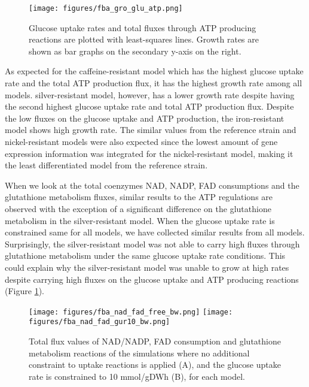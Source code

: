 \begin{figure}[H]
  \begin{center}
  \texttt{[image: figures/fba\_gro\_glu\_atp.png]}
  \caption[Glucose uptake rates and total fluxes through ATP producing reactions are plotted with least-squares lines. Growth rates are shown as bar graphs on the secondary y-axis on the right.]{Glucose uptake rates and total fluxes through ATP producing reactions are plotted with least-squares lines. Growth rates are shown as bar graphs on the secondary y-axis on the right.}
  \label{fig:fba_gro_glu_atp}
  \end{center}
\end{figure}

\vspace{-1cm}

As expected for the caffeine-resistant model which has the highest glucose uptake rate and the total ATP production flux, it has the highest growth rate among all models. silver-resistant model, however, has a lower growth rate despite having the second highest glucose uptake rate and total ATP production flux. Despite the low fluxes on the glucose uptake and ATP production, the iron-resistant model shows high growth rate. The similar values from the reference strain and nickel-resistant models were also expected since the lowest amount of gene expression information was integrated for the nickel-resistant model, making it the least differentiated model from the reference strain.

When we look at the total coenzymes NAD, NADP, FAD consumptions and the glutathione metabolism fluxes, similar results to the ATP regulations are observed with the exception of a significant difference on the glutathione metabolism in the silver-resistant model. When the glucose uptake rate is constrained same for all models, we have collected similar results from all models. Surprisingly, the silver-resistant model was not able to carry high fluxes through glutathione metabolism under the same glucose uptake rate conditions. This could explain why the silver-resistant model was unable to grow at high rates despite carrying high fluxes on the glucose uptake and ATP producing reactions (Figure \ref{fig:fba_gro_glu_atp}).

\begin{figure}[H]
  \begin{center}
  \texttt{[image: figures/fba\_nad\_fad\_free\_bw.png]}
  \baselineskip
  \texttt{[image: figures/fba\_nad\_fad\_gur10\_bw.png]}
  \caption[Total flux values of NAD/NADP, FAD consumption and glutathione metabolism reactions of the simulations where  no additional constraint to uptake reactions is applied (TOP), and the glucose uptake rate is constrained to 10 mmol/gDWh (BOTTOM), for each model]{Total flux values of NAD/NADP, FAD consumption and glutathione metabolism reactions of the simulations where  no additional constraint to uptake reactions is applied (A), and the glucose uptake rate is constrained to 10 mmol/gDWh (B), for each model.}
  \label{fig:fba_nad_fad}
  \end{center}
\end{figure}



